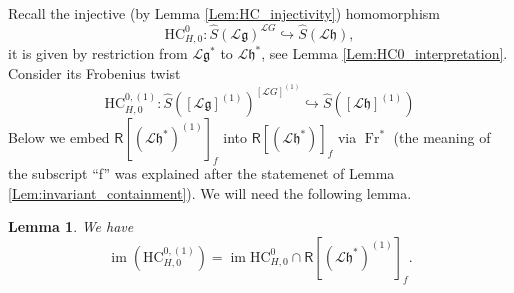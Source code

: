 \documentclass{amsart}
\newtheorem{Lem}[Thm]{Lemma}
\theoremstyle{definition}
\newcommand{\sss}{\subsubsection{}}
\newcommand{\Ring}{\mathsf{R}}
\newcommand{\g}{\mathfrak{g}}
\newcommand{\h}{\mathfrak{h}}
\newcommand{\HC}{\mathrm{HC}} %
\newcommand{\Loop}{\mathscr{L}}
\numberwithin{equation}{section}
\begin{document}
\sss Recall the injective (by Lemma \ref{Lem:HC_injectivity}) homomorphism $$\HC_{H,0}^0: \widehat{S}(\Loop\g)^{\Loop G}\hookrightarrow 
\widehat{S}(\Loop\h),$$
it is given by restriction from $\Loop \g^*$ to $\Loop \mathfrak{h}^*$, see Lemma \ref{Lem:HC0_interpretation}.
Consider its Frobenius twist 
$$\HC_{H,0}^{0,(1)}:\widehat{S}([\Loop\g]^{(1)})^{[\Loop G]^{(1)}}\hookrightarrow 
\widehat{S}([\Loop\h]^{(1)})$$
Below we embed $\Ring[(\Loop \h^*)^{(1)}]_f$ into
$\Ring[(\Loop \h^*)]_f$ via $\operatorname{Fr}^*$
(the meaning of the subscript ``f'' was explained after the statemenet of Lemma \ref{Lem:invariant_containment}). We will need the following lemma. 

\begin{Lem}\label{Prop:inv_frob}
We have 
\begin{equation}\label{eq:intersection_coincide}
\operatorname{im}(\HC_{H,0}^{0,(1)})=\operatorname{im}\HC_{H,0}^0\cap \Ring[(\Loop \h^*)^{(1)}]_f.
\end{equation}
\end{Lem}
\end{document}
